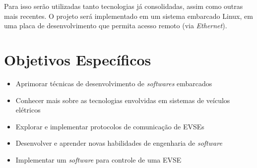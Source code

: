 Para isso serão utilizadas tanto tecnologias já consolidadas, assim como outras mais recentes. O projeto será implementado em um sistema embarcado Linux, em uma placa de desenvolvimento que permita acesso remoto (via \textit{Ethernet}).

\section{Objetivos Específicos}

\begin{itemize}
  \item Aprimorar técnicas de desenvolvimento de \textit{softwares} embarcados
  \item Conhecer mais sobre as tecnologias envolvidas em sistemas de veículos elétricos
  \item Explorar e implementar protocolos de comunicação de EVSEs
  \item Desenvolver e aprender novas habilidades de engenharia de \textit{software}
  \item Implementar um \textit{software} para controle de uma EVSE
\end{itemize}
